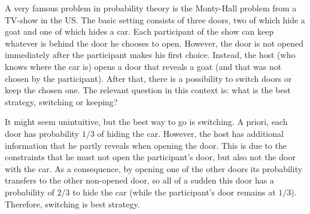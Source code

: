 \begin{ex}
A very famous problem in probability theory is the Monty-Hall problem from a TV-show in the US. The basic setting consists of three doors, two of which hide a goat and one of which hides a car. Each participant of the show can keep whatever is behind the door he chooses to open. However, the door is not opened immediately after the participant makes his first choice. Instead, the host (who knows where the car is) opens a door that reveals a goat (and that was not chosen by the participant). After that, there is a possibility to switch doors or keep the chosen one. The relevant question in this context is: what is the best strategy, switching or keeping?


It might seem unintuitive, but the best way to go is switching. A priori, each door has probability $1 / 3$ of hiding the car. However, the host has additional information that he partly reveals when opening the door. This is due to the constraints that he must not open the participant's door, but also not the door with the car. As a consequence, by opening one of the other doors its probability transfers to the other non-opened door, so all of a sudden this door has a probability of $2 / 3$ to hide the car (while the participant's door remains at $1 / 3$). Therefore, switching is best strategy.


\end{ex}
